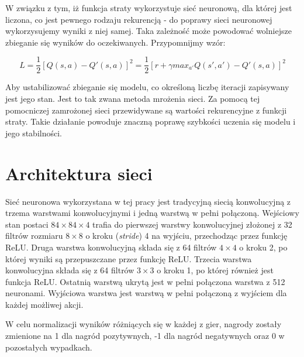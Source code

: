 \documentclass[12pt]{article}
\begin{document}
W związku z tym, iż funkcja straty wykorzystuje sieć neuronową, dla której jest liczona, co jest pewnego rodzaju rekurencją - do poprawy sieci neuronowej wykorzysujemy wyniki z niej samej. Taka zależność może powodować wolniejsze zbieganie się wyników do oczekiwanych. Przypomnijmy wzór: 

$$L=\frac{1}{2}[Q(s,a)-Q'(s,a)]^2=\frac{1}{2}[r+\gamma max_{a'}Q(s',a')-Q'(s,a)]^2$$

Aby ustabilizować zbieganie się modelu, co określoną liczbę iteracji zapisywany jest jego stan. Jest to tak zwana metoda mrożenia sieci. Za pomocą tej pomocniczej zamrożonej sieci przewidywane są wartości rekurencyjne z funkcji straty. Takie działanie powoduje znaczną poprawę szybkości uczenia się modelu i jego stabilności.

\section{Architektura sieci \cite{deepmind_2}}

Sieć neuronowa wykorzystana w tej pracy jest tradycyjną siecią konwolucyjną z trzema warstwami konwolucyjnymi i jedną warstwą w pełni połączoną. Wejściowy stan postaci $84\times84\times4$ trafia do pierwszej warstwy konwolucyjnej złożonej z 32 filtrów rozmiaru $8\times8$ o kroku (\textit{stride}) 4 na wyjściu, przechodząc przez funkcję ReLU. Druga warstwa konwolucyjną składa się z 64 filtrów $4\times4$ o kroku 2, po której wyniki są przepuszczane przez funkcję ReLU. Trzecia warstwa konwolucyjna składa się z 64 filtrów $3\times3$ o kroku 1, po której również jest funkcja ReLU. Ostatnią warstwą ukrytą jest w pełni połączona warstwa z 512 neuronami. Wyjściowa warstwa jest warstwą w pełni połączoną z wyjściem dla każdej możliwej akcji.

W celu normalizacji wyników różniących się w każdej z gier, nagrody zostały zmienione na 1 dla nagród pozytywnych, -1 dla nagród negatywnych oraz 0 w pozostałych wypadkach.
\end{document}

